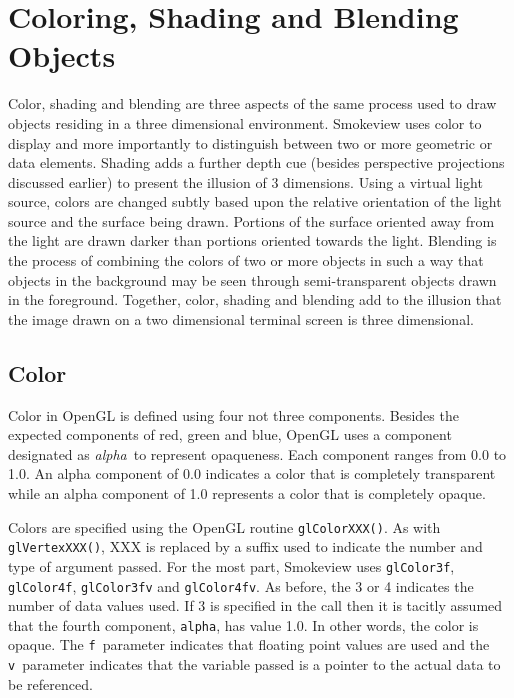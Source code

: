 \documentclass[11pt,twoside]{book}
\begin{document}
\section{Coloring, Shading and Blending Objects}
Color, shading and blending are three aspects of the same process used to draw objects residing in a three dimensional environment.  Smokeview uses color to display and more importantly to distinguish between two or more geometric or data elements.  Shading adds a further depth cue (besides perspective projections discussed earlier) to present the illusion of 3 dimensions.  Using a virtual light source, colors are changed subtly based upon the relative orientation of the light source and the surface being drawn.  Portions of the surface oriented away from the light are drawn darker than portions oriented towards the light.  Blending is the process of combining the colors of two or more objects in such a way that objects in the background may be seen through semi-transparent objects drawn in the foreground.  Together, color, shading and blending add to the illusion that the image drawn on a two dimensional terminal screen is three dimensional.

\subsection{Color}
Color in OpenGL is defined using four not three components.  Besides the expected components
of red, green and blue, OpenGL uses a component designated as {\em alpha}\ to represent opaqueness.
Each component ranges from 0.0 to 1.0. An alpha component of
0.0 indicates a color that is completely transparent while an alpha component of 1.0
represents a color that is completely opaque.

Colors are specified using the OpenGL routine {\tt glColorXXX()}.  As with {\tt glVertexXXX()}, XXX is replaced by a suffix used to indicate the number and type of argument passed.  For the most part, Smokeview uses {\tt glColor3f}, {\tt glColor4f}, {\tt glColor3fv} and {\tt glColor4fv}.  As before, the 3 or 4 indicates the number of data values used.  If 3 is specified in the call then it is tacitly assumed that the fourth component, {\tt alpha}, has value 1.0.  In other words, the color is opaque.  The {\tt f}\ parameter indicates that floating point values are used and the {\tt v}\ parameter indicates that the variable passed is a pointer to the actual data to be referenced.
\end{document}
